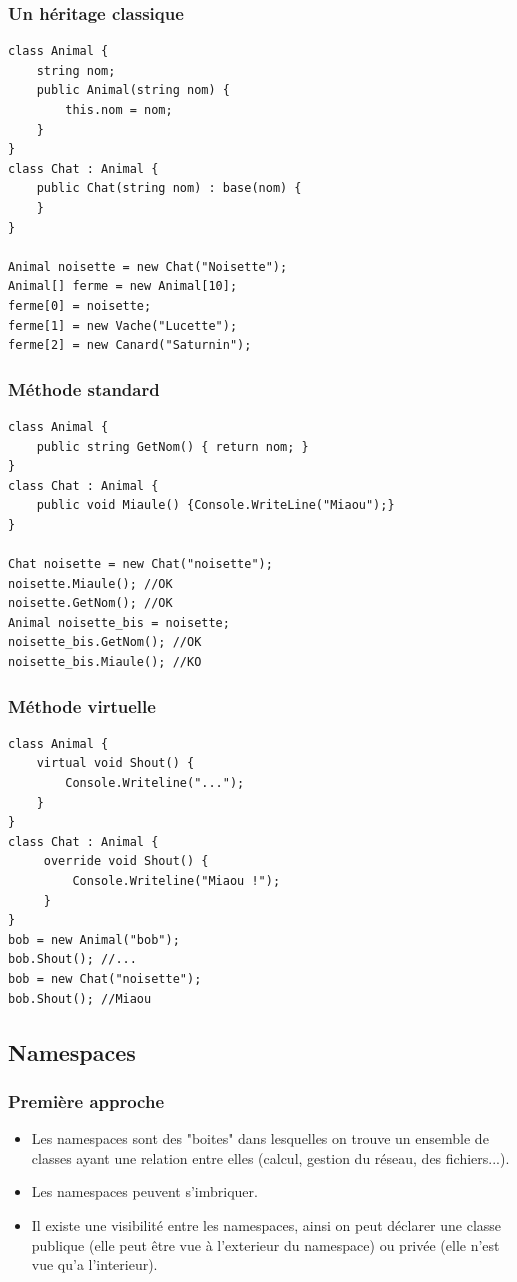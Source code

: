 \documentclass{beamer}
\begin{document}
\begin{frame}[fragile]
\frametitle{Un héritage classique}
\begin{lstlisting}
class Animal {
    string nom;
    public Animal(string nom) {
        this.nom = nom;
    }
}
class Chat : Animal {
    public Chat(string nom) : base(nom) {
    }
}

Animal noisette = new Chat("Noisette");
Animal[] ferme = new Animal[10];
ferme[0] = noisette;
ferme[1] = new Vache("Lucette");
ferme[2] = new Canard("Saturnin");
\end{lstlisting}
\end{frame}

\begin{frame}[fragile]
\frametitle{Méthode standard}
\begin{lstlisting}
class Animal {
    public string GetNom() { return nom; }
}
class Chat : Animal {
    public void Miaule() {Console.WriteLine("Miaou");}
}

Chat noisette = new Chat("noisette");
noisette.Miaule(); //OK
noisette.GetNom(); //OK
Animal noisette_bis = noisette;
noisette_bis.GetNom(); //OK
noisette_bis.Miaule(); //KO
\end{lstlisting}
\end{frame}


\begin{frame}[fragile]
\frametitle{Méthode virtuelle}
\begin{lstlisting}
class Animal {
    virtual void Shout() {
        Console.Writeline("...");
    }
}
class Chat : Animal {
     override void Shout() {
         Console.Writeline("Miaou !");
     }
}
bob = new Animal("bob");
bob.Shout(); //...
bob = new Chat("noisette");
bob.Shout(); //Miaou
\end{lstlisting}
\end{frame}

\subsection{Namespaces}

\begin{frame}
\frametitle{Première approche}
\begin{itemize}
\item Les namespaces sont des "boites" dans lesquelles on trouve un ensemble de classes ayant une relation entre elles (calcul, gestion du réseau, des fichiers...).
\item Les namespaces peuvent s'imbriquer.
\item Il existe une visibilité entre les namespaces, ainsi on peut déclarer une classe publique (elle peut être vue à l'exterieur du namespace) ou privée (elle n'est vue qu'a l'interieur).

\end{itemize}
\end{frame}
\end{document}
